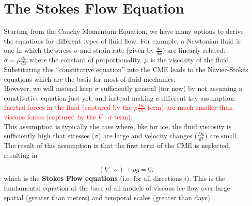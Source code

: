 \documentclass[12pt]{article}
\theoremstyle{definition}
\begin{document}
\section{The Stokes Flow Equation}

Starting from the Cauchy Momentum Equation, we have many options to derive the equations for different types of fluid flow. For example, a Newtonian fluid is one in which the stress $\sigma$ and strain rate (given by $\frac{du}{dx}$) are linearly related: $\sigma = \mu \frac{du}{dx}$ where the constant of proportionality, $\mu$ is the viscosity of the fluid. Substituting this ``constitutive equation'' into the CME leads to the Navier-Stokes equations which are the basis for most of fluid mechanics. \\

However, we will instead keep $\sigma$ sufficiently general (for now) by not assuming a constitutive equation just yet, and instead making a different key assumption: \\

\textcolor{red}{Inertial forces in the fluid (captured by the $\rho \frac{Du}{dt}$ term) are much smaller than viscous forces (captured by the $\nabla \cdot \sigma$ term).} \\

This assumption is typically the case where, like for ice, the fluid viscosity is sufficiently high that stresses ($\sigma$) are large and velocity changes ($\frac{Du}{dt}$) are small. The result of this assumption is that the first term of the CME is neglected, resulting in
\begin{shaded}
\begin{equation}
\left(\nabla \cdot \sigma \right) + \rho g = 0.
\end{equation}
which is the \textbf{Stokes Flow equations} (i.e. for all directions $i$). This is the fundamental equation at the base of all models of viscous ice flow over large spatial (greater than meters) and temporal scales (greater than days).
\end{shaded}
\end{document}
